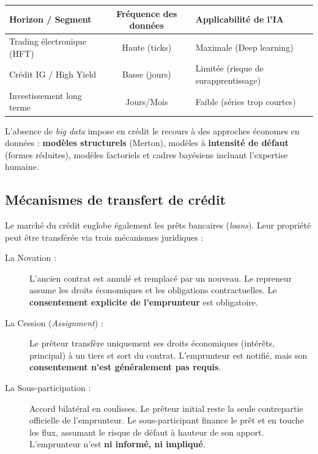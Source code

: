 \begin{center}
\renewcommand{\arraystretch}{1.3}
\begin{tabular}{|l|c|p{5cm}|}
\hline
\textbf{Horizon / Segment} & \textbf{Fréquence des données} & \textbf{Applicabilité de l'IA} \\
\hline
Trading électronique (HFT) & Haute (ticks) & Maximale (Deep learning) \\
\hline
Crédit IG / High Yield & Basse (jours) & Limitée (risque de surapprentissage) \\
\hline
Investissement long terme & Jours/Mois & Faible (séries trop courtes) \\
\hline
\end{tabular}
\end{center}

\begin{remarque}
L'absence de \textit{big data} impose en crédit le recours à des approches économes en données : \textbf{modèles structurels} (Merton), modèles à \textbf{intensité de défaut} (formes réduites), modèles factoriels et cadres bayésiens incluant l'expertise humaine.
\end{remarque}

\subsection{Mécanismes de transfert de crédit}
Le marché du crédit englobe également les prêts bancaires (\textit{loans}). Leur propriété peut être transférée via trois mécanismes juridiques :

\begin{description}
    \item[La Novation :] L'ancien contrat est annulé et remplacé par un nouveau. Le repreneur assume les droits économiques et les obligations contractuelles. Le \textbf{consentement explicite de l'emprunteur} est obligatoire.
    \item[La Cession (\textit{Assignment}) :] Le prêteur transfère uniquement ses droits économiques (intérêts, principal) à un tiers et sort du contrat. L'emprunteur est notifié, mais son \textbf{consentement n'est généralement pas requis}.
    \item[La Sous-participation :] Accord bilatéral en coulisses. Le prêteur initial reste la seule contrepartie officielle de l'emprunteur. Le sous-participant finance le prêt et en touche les flux, assumant le risque de défaut à hauteur de son apport. L'emprunteur n'est \textbf{ni informé, ni impliqué}.
\end{description}

